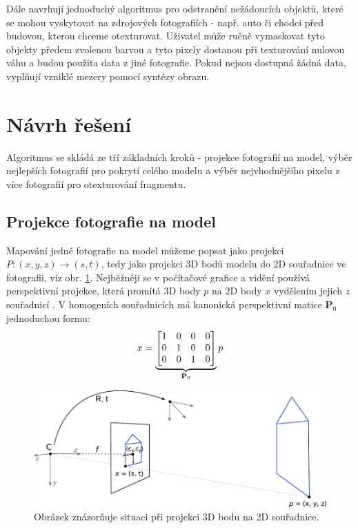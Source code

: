 \documentclass[11pt,twoside,a4paper]{book}
\begin{document}
Dále navrhují jednoduchý algoritmus pro odstranění nežádoucích objektů, které se mohou vyskytovat na zdrojových fotografiích - např. auto či chodci před budovou, kterou chceme otexturovat. Uživatel může ručně vymaskovat tyto objekty předem zvolenou barvou a tyto pixely dostanou při texturování nulovou váhu a budou použita data z jiné fotografie. Pokud nejsou dostupná žádná data, vyplňují vzniklé mezery pomocí syntézy obrazu.

\section{Návrh řešení}

Algoritmus se skládá ze tří základních kroků - projekce fotografií na model, výběr nejlepších fotografií pro pokrytí celého modelu a výběr nejvhodnějšího pixelu z více fotografií pro otexturování fragmentu.

\subsection{Projekce fotografie na model}
\label{sec:matice-kamery}

Mapování jedné fotografie na model můžeme popsat jako projekci $P: (x, y, z) \to (s, t)$, tedy jako projekci 3D bodů modelu do 2D souřadnice ve fotografii, viz obr. \ref{fig:camera-projection}. Nejběžněji se v počítačové grafice a vidění používá perspektivní projekce, která promítá 3D body $p$ na 2D body $x$ vydělením jejich $z$ souřadnicí \cite{Szeliski}. V homogeních souřadnicích má kanonická perspektivní matice \textbf{P}$_0$ jednoduchou formu:
\begin{align}
\label{eq:persp-projection}
x = 
\underbrace{
\begin{bmatrix}
1 & 0 & 0 & 0 \\
0 & 1 & 0 & 0 \\
0 & 0 & 1 & 0 \\
\end{bmatrix}}_\text{\textbf{P}$_0$}
p
\end{align}
\noindent

\begin{figure}[t]
\begin{center}
\includegraphics[width=\textwidth]{figures/camera-projection}
\caption{Obrázek znázorňuje situaci při projekci 3D bodu na 2D souřadnice.}
\label{fig:camera-projection}
\end{center}
\end{figure}
\end{document}

